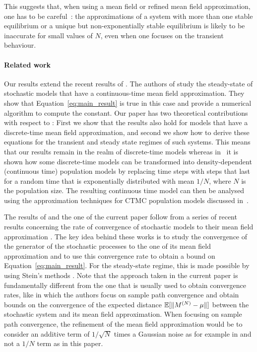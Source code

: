 \documentclass{elsarticle}
\begin{document}
This suggests that, when using a mean field or refined mean field
approximation, one has to be careful~: the approximations of a system
with more than one stable equilibrium or a unique but
non-exponentially stable equilibrium is likely to be inaccurate for
small values of $N$, even when one focuses on the transient behaviour.

\paragraph*{Related work} Our results extend the recent results of
\cite{gast2017refined}. The authors of \cite{gast2017refined} study
the steady-state of stochastic models that have a continuous-time mean
field approximation. They show that Equation~\eqref{eq:main_result} is
true in this case and provide a numerical algorithm to compute the
constant. Our paper has two theoretical contributions with respect to
\cite{gast2017refined} : First we show that the results also hold for
models that have a discrete-time mean field approximation, and second
we show how to derive these equations for the transient and steady
state regimes of such systems.  This means that our results remain in
the realm of discrete-time models whereas in~\cite{gast2017refined} it
is shown how some discrete-time models can be transformed into
density-dependent (continuous time) population models by replacing
time steps with steps that last for a random time that is
exponentially distributed with mean $1/N$, where $N$ is the population
size. The resulting continuous time model can then be analysed using
the approximation techniques for CTMC population models discussed
in~\cite{gast2017refined}.

The results of \cite{gast2017refined} and the one of the current paper
follow from a series of recent results concerning the rate of
convergence of stochastic models to their mean field approximation
\cite{gast2017expected,ying2016rate,ying2017stein,kolokoltsov2011mean}. The
key idea behind these works is to study the convergence of the
generator of the stochastic processes to the one of its mean field
approximation and to use this convergence rate to obtain a bound on
Equation~\eqref{eq:main_result}.  For the steady-state regime, this is
made possible by using Stein's methods
\cite{stein1986approximate,braverman2017stein,braverman2017stein2}.
Note that the approach taken in the current paper is fundamentally
different from the one that is usually used to obtain convergence
rates, like \cite{gast2012markov,bortolussi2013bounds,gastgaujalDEDS}
in which the authors focus on sample path convergence and obtain
bounds on the convergence of the expected distance
$\esp{\norm{\MN-\mu}}$ between the stochastic system and its mean
field approximation. When focusing on sample path convergence, the
refinement of the mean field approximation would be to consider an
additive term of $1/\sqrt{N}$ times a Gaussian noise as for example in
\cite{gast2012markov} and not a $1/N$ term as in this paper.
\end{document}
